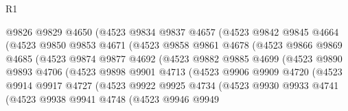 \begin{lexlean}{R1}
\begin{coremodule}
                      @9826
                      @9829
                      @4650
                      (@4523
                        @9834
                        @9837
                        @4657
                        (@4523
                          @9842
                          @9845
                          @4664
                          (@4523
                            @9850
                            @9853
                            @4671
                            (@4523
                              @9858
                              @9861
                              @4678
                              (@4523
                                @9866
                                @9869
                                @4685
                                (@4523
                                  @9874
                                  @9877
                                  @4692
                                  (@4523
                                    @9882
                                    @9885
                                    @4699
                                    (@4523
                                      @9890
                                      @9893
                                      @4706
                                      (@4523
                                        @9898
                                        @9901
                                        @4713
                                        (@4523
                                          @9906
                                          @9909
                                          @4720
                                          (@4523
                                            @9914
                                            @9917
                                            @4727
                                            (@4523
                                              @9922
                                              @9925
                                              @4734
                                              (@4523
                                                @9930
                                                @9933
                                                @4741
                                                (@4523
                                                  @9938
                                                  @9941
                                                  @4748
                                                  (@4523
                                                    @9946
                                                    @9949

\end{coremodule}
\end{lexlean}
